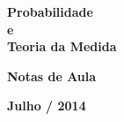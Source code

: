 %
%
%
\begin{titlepage}			%

\begin{center}				%

	{\fontsize{16mm}{11mm}
		\selectfont
		\textbf{Probabilidade} 
		\\[0.3cm]
		\textbf{e}
		\\[0.3cm] 
		\textbf{Teoria da Medida} 
		}

	\vspace{60mm}				%


	{\fontsize{14pt}{14pt}\selectfont
		\textbf{Notas de Aula}
		}
	
	\vspace{7pt}				%


	{\fontsize{14pt}{14pt}\selectfont
		\textbf{Julho / 2014}
		}
	
	\vfill						%










	\vspace{10mm}				%
	\begin{figure}[h]            %
		\centering
	\end{figure} 

\end{center}
\end{titlepage}
